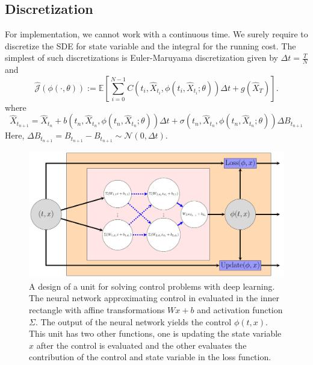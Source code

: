 \documentclass[11pt]{book}
\begin{document}
\subsection{Discretization}
For implementation, we cannot work with a continuous time. We surely require to discretize the SDE for state variable and the integral for the running cost. The simplest of such discretizations is Euler-Maruyama discretization given by $\Delta t = \frac{T}{N}$ and
\begin{equation}\label{func:loss_discrete}
\hat{\mathcal{J}}(\phi(\cdot,\theta)):=\mathbb{E}\left[\sum_{i=0}^{N-1} C(t_{i},\hat{X}_{t_i},\phi(t_{i},\hat{X}_{t_{i}};\theta))\Delta t+g(\hat{X}_T)\right].
\end{equation}
where 
\[
\hat{X}_{t_{n+1}} = \hat{X}_{t_{n}} + b(t_{n},\hat{X}_{t_{n}},\phi(t_{n},\hat{X}_{t_{n}};\theta)) \Delta t+\sigma(t_{n},\hat{X}_{t_{n}},\phi(t_{n},\hat{X}_{t_{n}};\theta))\Delta B_{t_{n+1}}
\]
Here, $\Delta B_{t_{n+1}}= B_{t_{n+1}}- B_{t_{n+1}}\sim\mathcal{N}(0,\Delta t)$.
\begin{figure}[ht]
    \centering
    \includegraphics[width=0.8\linewidth]{Control_lecture_notes/Figs/OneUnit.pdf}
    \caption{A design of a unit for solving control problems with deep learning. The neural network approximating control in evaluated in the inner rectangle with affine transformations $Wx+b$ and activation function  $\Sigma$. The output of the neural network yields the control $\phi(t,x)$. This unit has two other functions, one is updating the state variable $x$ after the control is evaluated and the other evaluates the contribution of the  control and state variable in the loss function.}
    \label{fig:pgm_unit}
\end{figure}
\end{document}
